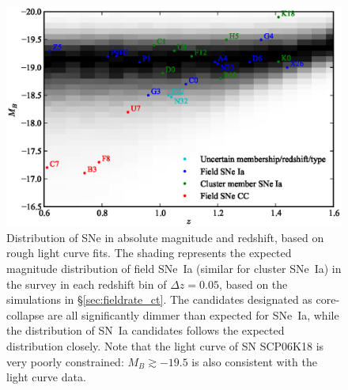 

\begin{figure}[t]
\begin{center}
\includegraphics[width=\textwidth]{figures/cands/absmag_vs_z_field.eps}
\end{center}
\caption[Magnitude and redshift distribution of SN
  candidates]{Distribution of SNe in absolute magnitude and redshift,
  based on rough light curve fits. The shading represents the expected
  magnitude distribution of field SNe~Ia (similar for cluster SNe~Ia)
  in the survey in each redshift bin of $\Delta z = 0.05$, based on
  the simulations in \S\ref{sec:fieldrate_ct}. The candidates
  designated as core-collapse are all significantly dimmer than
  expected for SNe~Ia, while the distribution of SN~Ia candidates
  follows the expected distribution closely. Note that the light curve
  of SN SCP06K18 is very poorly constrained: $M_B \gtrsim -19.5$ is
  also consistent with the light curve data.\label{fig:absmag_vs_z}}
\end{figure}
